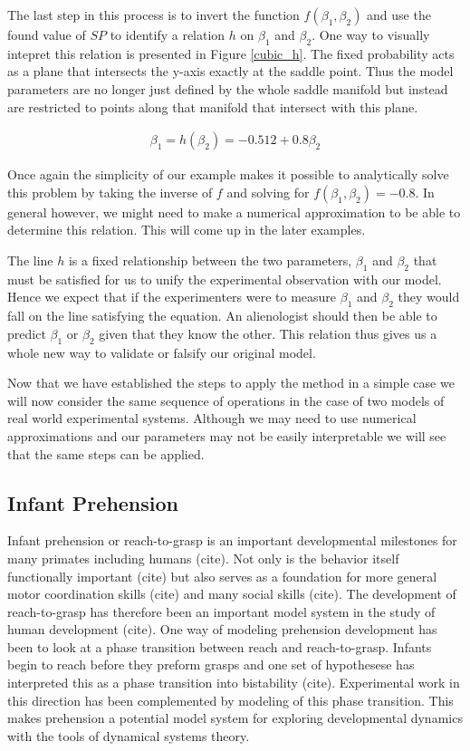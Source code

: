 \documentclass[letterpaper]{article}
\begin{document}
The last step in this process is to invert the function $f(\beta_1,\beta_2)$ 
and use the found value of $SP$ to identify a relation $h$ on $\beta_1$ and $\beta_2$.
One way to visually intepret this relation is presented in Figure \ref{cubic_h}.
The fixed probability acts as a plane that intersects the y-axis exactly at the
saddle point. Thus the model parameters are no longer just defined by the whole
saddle manifold but instead are restricted to points along that manifold that intersect
with this plane. 


\begin{eqnarray}
    \beta_1 = h(\beta_2) = -0.512 + 0.8 \beta_2
\end{eqnarray}

Once again the simplicity of our example makes it possible to analytically 
solve this problem
by taking the inverse of $f$ and solving for $f(\beta_1,\beta_2) = -0.8$.
In general however, we might need to make a numerical
approximation to be able to determine this relation. This will come up in the 
later examples.

The line $h$ is a fixed relationship between
the two parameters, $\beta_1$ and $\beta_2$ that must be satisfied for us to 
unify the experimental observation with
our model. Hence we expect that if the experimenters were to measure $\beta_1$ and 
$\beta_2$ they would fall on the line satisfying the equation. An alienologist 
should then be able to predict $\beta_1$ or $\beta_2$ given that they
know the other. This relation thus gives us a whole new way to validate or
falsify our original model. 

Now that we have established the steps to apply the method in a simple case we will now 
consider the same sequence of operations in the case of two models of real world experimental
systems. Although we may need to use numerical approximations and our parameters may not
be easily interpretable we will see that the same steps can be applied.

\subsection{Infant Prehension}

Infant prehension or reach-to-grasp is an important developmental milestones 
for many primates including humans (cite). Not only is the behavior itself
functionally important (cite) but also serves as a foundation for more general motor
coordination skills (cite) and many social skills (cite). The development of 
reach-to-grasp
has therefore been an important model system in the study of human development (cite). 
One way of modeling prehension development has been to look at a phase transition
between reach and reach-to-grasp. Infants begin to reach before they preform grasps and
one set of hypothesese has interpreted this as a phase transition into bistability (cite). 
Experimental work in this direction has been complemented by modeling of this phase
transition. This makes prehension a potential model system for exploring developmental
dynamics with the tools of dynamical systems theory.
\end{document}
